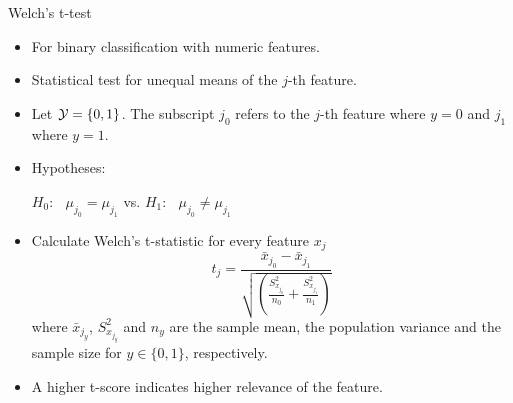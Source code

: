 \documentclass[11pt,compress,t,notes=noshow, xcolor=table]{beamer}
\begin{document}

  \begin{vbframe}{Welch's \MakeLowercase{t}-test}
  \begin{itemize}
    \item For binary classification with numeric features.
    \item Statistical test for unequal means of the $j$-th feature.
    \item Let $\mathcal{Y} = \{ 0, 1\}$. The subscript $j_0$ refers to the $j$-th feature where $y = 0$ and $j_1$ where $y = 1$.
   \item Hypotheses:

    $H_0$: $\;\;\mu_{j_0} = \mu_{j_1} $ \qquad vs. \qquad $H_1$: $\;\;\mu_{j_0} \neq \mu_{j_1}$

    \item Calculate Welch's t-statistic for every feature $x_j$
    $$ t_j = \frac{\bar{x}_{j_0} - \bar{x}_{j_1}}{\sqrt{(\frac{S^2_{x_{j_0}}}{n_0} + \frac{S^2_{x_{j_1}}}{n_1})}}$$
    where $\bar{x}_{j_y}$, $S^2_{x_{j_{y}}}$ and $n_y$ are the sample mean, the population variance and the sample size for $y\in\{0,1\}$, respectively.
    \item A higher t-score indicates higher relevance of the feature.
  \end{itemize}
  \end{vbframe}
\end{document}
